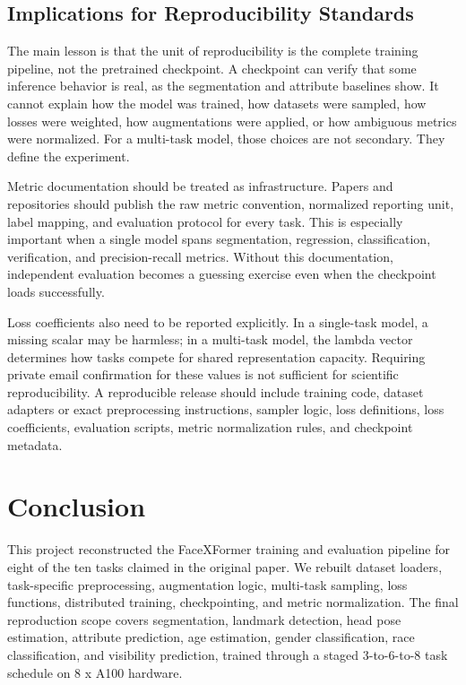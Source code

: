 \documentclass[11pt]{article}
\begin{document}
\subsection{Implications for Reproducibility Standards}


The main lesson is that the unit of reproducibility is the complete training pipeline, not the pretrained checkpoint. A checkpoint can verify that some inference behavior is real, as the segmentation and attribute baselines show. It cannot explain how the model was trained, how datasets were sampled, how losses were weighted, how augmentations were applied, or how ambiguous metrics were normalized. For a multi-task model, those choices are not secondary. They define the experiment.


Metric documentation should be treated as infrastructure. Papers and repositories should publish the raw metric convention, normalized reporting unit, label mapping, and evaluation protocol for every task. This is especially important when a single model spans segmentation, regression, classification, verification, and precision-recall metrics. Without this documentation, independent evaluation becomes a guessing exercise even when the checkpoint loads successfully.


Loss coefficients also need to be reported explicitly. In a single-task model, a missing scalar may be harmless; in a multi-task model, the lambda vector determines how tasks compete for shared representation capacity. Requiring private email confirmation for these values is not sufficient for scientific reproducibility. A reproducible release should include training code, dataset adapters or exact preprocessing instructions, sampler logic, loss definitions, loss coefficients, evaluation scripts, metric normalization rules, and checkpoint metadata.


\section{Conclusion}


This project reconstructed the FaceXFormer training and evaluation pipeline for eight of the ten tasks claimed in the original paper. We rebuilt dataset loaders, task-specific preprocessing, augmentation logic, multi-task sampling, loss functions, distributed training, checkpointing, and metric normalization. The final reproduction scope covers segmentation, landmark detection, head pose estimation, attribute prediction, age estimation, gender classification, race classification, and visibility prediction, trained through a staged 3-to-6-to-8 task schedule on 8 x A100 hardware.
\end{document}
